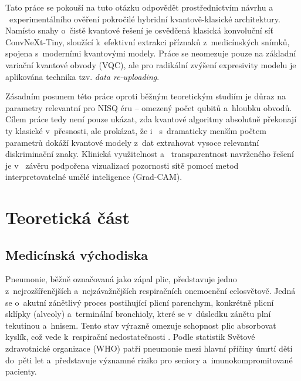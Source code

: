 \documentclass[12pt, a4paper]{report}
\begin{document}
Tato práce se pokouší na tuto otázku odpovědět prostřednictvím návrhu a ~experimentálního ověření pokročilé hybridní kvantově-klasické architektury. Namísto snahy o~čistě kvantové řešení je osvědčená klasická konvoluční síť ConvNeXt-Tiny, sloužící k~efektivní extrakci příznaků z~medicínských snímků, spojena s~moderními kvantovými modely. Práce se neomezuje pouze na základní variační kvantové obvody (VQC), ale pro radikální zvýšení expresivity modelu je aplikována technika tzv. \textit{data re-uploading}.

Zásadním posunem této práce oproti běžným teoretickým studiím je důraz na parametry relevantní pro NISQ éru -- omezený počet qubitů a~hloubku obvodů. Cílem práce tedy není pouze ukázat, zda kvantové algoritmy absolutně překonají ty klasické v~přesnosti, ale prokázat, že i ~s~dramaticky menším počtem parametrů dokáží kvantové modely z~dat extrahovat vysoce relevantní diskriminační znaky. Klinická využitelnost a ~transparentnost navrženého řešení je v ~závěru podpořena vizualizací pozornosti sítě pomocí metod interpretovatelné umělé inteligence (Grad-CAM).

\chapter{Teoretická část} \label{chap:teorie}

\section{Medicínská východiska} \label{sec:medicina}

Pneumonie, běžně označovaná jako zápal plic, představuje jedno z~nejrozšířenějších a~nejzávažnějších respiračních onemocnění celosvětově.
Jedná se o~akutní zánětlivý proces postihující plicní parenchym, konkrétně plicní sklípky (alveoly) a~terminální bronchioly, které se v~důsledku zánětu plní tekutinou a~hnisem.
Tento stav výrazně omezuje schopnost plic absorbovat kyslík, což vede k~respirační nedostatečnosti \cite{who_pneumonia}.
Podle statistik Světové zdravotnické organizace (WHO) patří pneumonie mezi hlavní příčiny úmrtí dětí do~pěti let a~představuje významné riziko pro seniory a~imunokompromitované pacienty.
\end{document}

